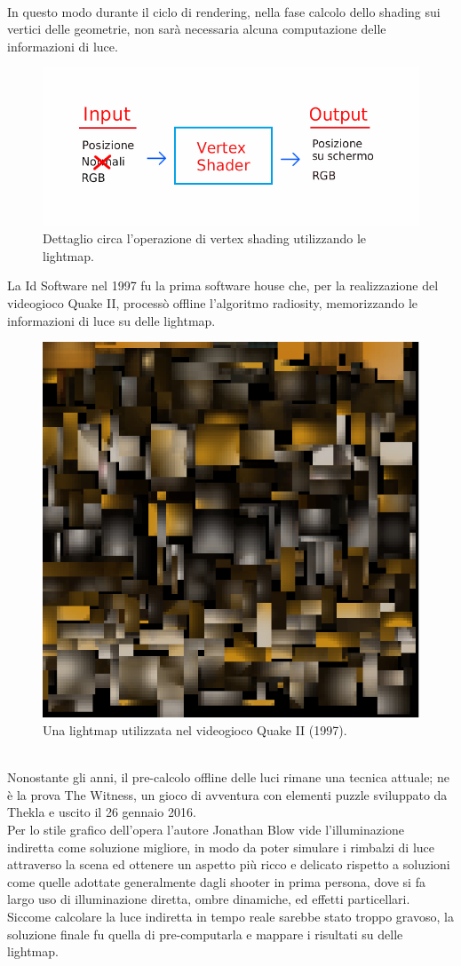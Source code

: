 \\
In questo modo durante il ciclo di rendering, nella fase calcolo dello shading sui vertici delle geometrie, non sarà necessaria alcuna computazione delle informazioni di luce.
\newpage 
\begin{figure}[htb]
 \centering
 \includegraphics[width=0.8\linewidth]{images/chapter_stato_arte/stato_arte_ver_sh.jpg}\hfill
 \caption[Vertex shading lightmap]{Dettaglio circa l'operazione di vertex shading utilizzando le lightmap.}
 \label{fig:stato_arte_ver_sh}
\end{figure}
La Id Software nel 1997 fu la prima software house che, per la realizzazione del videogioco Quake II, processò offline l’algoritmo radiosity, memorizzando le informazioni di luce su delle lightmap. \cite{light7}
\\
\begin{figure}[htb]
 \centering
 \includegraphics[width=0.4\linewidth]{images/chapter_stato_arte/stato_arte_quake_lightmap.png}\hfill
 \caption[Lightmap Quake II]{Una lightmap utilizzata nel videogioco Quake II (1997).}
 \label{fig:stato_arte_quake_lightmap}
\end{figure}
\\
Nonostante gli anni, il pre-calcolo offline delle luci rimane una tecnica attuale; ne è la prova The Witness, un gioco di avventura con elementi puzzle sviluppato da Thekla e uscito il 26 gennaio 2016. \cite{light3,light4,light8}
\\
Per lo stile grafico dell’opera l’autore Jonathan Blow vide l’illuminazione indiretta come soluzione migliore, in modo da poter simulare i rimbalzi di luce attraverso la scena ed ottenere un aspetto più ricco e delicato rispetto a soluzioni come quelle adottate generalmente dagli shooter in prima persona, dove si fa largo uso di illuminazione diretta, ombre dinamiche, ed effetti particellari. Siccome calcolare la luce indiretta in tempo reale sarebbe stato troppo gravoso, la soluzione finale fu quella di pre-computarla e mappare i risultati su delle   lightmap.	
